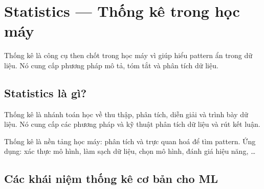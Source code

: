 \section{Statistics --- Thống kê trong học máy}
\label{sec:statistics}

\begin{dongco}[title={Vai trò của thống kê}]
Thống kê là công cụ then chốt trong học máy vì giúp hiểu pattern ẩn trong dữ liệu.
Nó cung cấp phương pháp mô tả, tóm tắt và phân tích dữ liệu.
\end{dongco}

\subsection{Statistics là gì?}

\begin{dinhnghia}[title={Định nghĩa}]
Thống kê là nhánh toán học về thu thập, phân tích, diễn giải và trình bày dữ liệu.
Nó cung cấp các phương pháp và kỹ thuật phân tích dữ liệu và rút kết luận.
\end{dinhnghia}

\begin{ynghia}[title={Nền tảng cho ML}]
Thống kê là nền tảng học máy: phân tích và trực quan hoá để tìm pattern.
Ứng dụng: xác thực mô hình, làm sạch dữ liệu, chọn mô hình, đánh giá hiệu năng, \ldots
\end{ynghia}

\subsection{Các khái niệm thống kê cơ bản cho ML}

